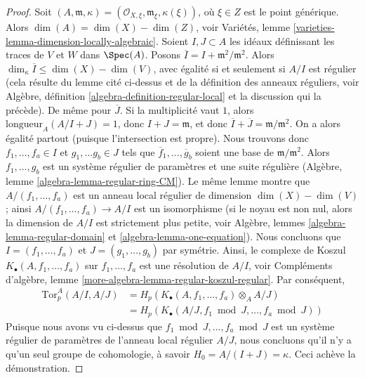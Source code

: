 \begin{proof}
Soit $(A, \mathfrak m, \kappa) =
(\mathcal{O}_{X, \xi}, \mathfrak m_\xi, \kappa(\xi))$, où $\xi \in Z$
est le point générique. Alors $\dim(A) = \dim(X) - \dim(Z)$, voir
Variétés, lemme \ref{varieties-lemma-dimension-locally-algebraic}.
Soient $I, J \subset A$ les idéaux définissant les traces de $V$ et $W$
dans $\Spec(A)$. Posons $\overline{I} = I + \mathfrak m^2/\mathfrak m^2$.
Alors $\dim_\kappa \overline{I} \leq \dim(X) - \dim(V)$, avec égalité
si et seulement si $A/I$ est régulier (cela résulte du lemme cité
ci-dessus et de la définition des anneaux réguliers, voir
Algèbre, définition \ref{algebra-definition-regular-local}
et la discussion qui la précède). De même pour $\overline{J}$.
Si la multiplicité vaut $1$, alors
$\text{longueur}_A(A/I + J) = 1$, donc $I + J = \mathfrak m$, et donc
$\overline{I} + \overline{J} = \mathfrak m/\mathfrak m^2$.
On a alors égalité partout (puisque l'intersection est
propre). Nous trouvons donc $f_1, \ldots, f_a \in I$ et $g_1, \ldots g_b \in J$
tels que $\overline{f}_1, \ldots, \overline{g}_b$ soient une base
de $\mathfrak m/\mathfrak m^2$. Alors $f_1, \ldots, g_b$ est un
système régulier de paramètres et une suite régulière
(Algèbre, lemme \ref{algebra-lemma-regular-ring-CM}).
Le même lemme montre que $A/(f_1, \ldots, f_a)$ est un anneau local régulier
de dimension $\dim(X) - \dim(V)$ ; ainsi $A/(f_1, \ldots, f_a) \to A/I$
est un isomorphisme (si le noyau est non nul, alors la dimension
de $A/I$ est strictement plus petite, voir
Algèbre, lemmes \ref{algebra-lemma-regular-domain} et
\ref{algebra-lemma-one-equation}).
Nous concluons que $I = (f_1, \ldots, f_a)$ et $J = (g_1, \ldots, g_b)$
par symétrie. Ainsi, le complexe de Koszul $K_\bullet(A, f_1, \ldots, f_a)$
sur $f_1, \ldots, f_a$ est une résolution de $A/I$, voir
Compléments d'algèbre, lemme \ref{more-algebra-lemma-regular-koszul-regular}.
Par conséquent,
\begin{align*}
\text{Tor}_p^A(A/I, A/J)
& =
H_p(K_\bullet(A, f_1, \ldots, f_a) \otimes_A A/J) \\
& =
H_p(K_\bullet(A/J, f_1 \bmod J, \ldots, f_a \bmod J))
\end{align*}
Puisque nous avons vu ci-dessus que $f_1 \bmod J, \ldots, f_a \bmod J$ est
un système régulier de paramètres de l'anneau local régulier $A/J$,
nous concluons qu'il n'y a qu'un seul groupe de cohomologie, à savoir
$H_0 = A/(I + J) = \kappa$. Ceci achève la démonstration.
\end{proof}

